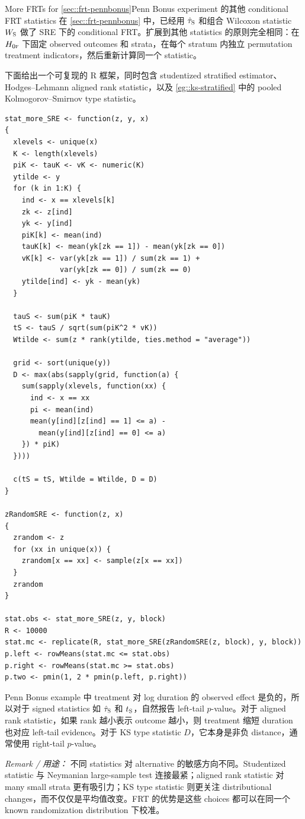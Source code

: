 \begin{exercisesolution}{More FRTs for \cref{sec::frt-pennbonus}}{Penn Bonus experiment 的其他 conditional FRT statistics}
在 \cref{sec::frt-pennbonus} 中，已经用 $\hat\tau_{\textsc{S}}$ 和组合 Wilcoxon statistic $W_{\textsc{S}}$ 做了 SRE 下的 conditional FRT。扩展到其他 statistics 的原则完全相同：在 $H_{0\textsc{f}}$ 下固定 observed outcomes 和 strata，在每个 stratum 内独立 permutation treatment indicators，然后重新计算同一个 statistic。

下面给出一个可复现的 R 框架，同时包含 studentized stratified estimator、Hodges--Lehmann aligned rank statistic，以及 \cref{eg::ks-stratified} 中的 pooled Kolmogorov--Smirnov type statistic。
\begin{lstlisting}
stat_more_SRE <- function(z, y, x)
{
  xlevels <- unique(x)
  K <- length(xlevels)
  piK <- tauK <- vK <- numeric(K)
  ytilde <- y
  for (k in 1:K) {
    ind <- x == xlevels[k]
    zk <- z[ind]
    yk <- y[ind]
    piK[k] <- mean(ind)
    tauK[k] <- mean(yk[zk == 1]) - mean(yk[zk == 0])
    vK[k] <- var(yk[zk == 1]) / sum(zk == 1) +
             var(yk[zk == 0]) / sum(zk == 0)
    ytilde[ind] <- yk - mean(yk)
  }

  tauS <- sum(piK * tauK)
  tS <- tauS / sqrt(sum(piK^2 * vK))
  Wtilde <- sum(z * rank(ytilde, ties.method = "average"))

  grid <- sort(unique(y))
  D <- max(abs(sapply(grid, function(a) {
    sum(sapply(xlevels, function(xx) {
      ind <- x == xx
      pi <- mean(ind)
      mean(y[ind][z[ind] == 1] <= a) -
        mean(y[ind][z[ind] == 0] <= a)
    }) * piK)
  })))

  c(tS = tS, Wtilde = Wtilde, D = D)
}

zRandomSRE <- function(z, x)
{
  zrandom <- z
  for (xx in unique(x)) {
    zrandom[x == xx] <- sample(z[x == xx])
  }
  zrandom
}

stat.obs <- stat_more_SRE(z, y, block)
R <- 10000
stat.mc <- replicate(R, stat_more_SRE(zRandomSRE(z, block), y, block))
p.left <- rowMeans(stat.mc <= stat.obs)
p.right <- rowMeans(stat.mc >= stat.obs)
p.two <- pmin(1, 2 * pmin(p.left, p.right))
\end{lstlisting}

Penn Bonus example 中 treatment 对 log duration 的 observed effect 是负的，所以对于 signed statistics 如 $\hat\tau_{\textsc{S}}$ 和 $t_{\textsc{S}}$，自然报告 left-tail $p$-value。对于 aligned rank statistic，如果 rank 越小表示 outcome 越小，则 treatment 缩短 duration 也对应 left-tail evidence。对于 KS type statistic $D$，它本身是非负 distance，通常使用 right-tail $p$-value。

\emph{Remark / 用途：} 不同 statistics 对 alternative 的敏感方向不同。Studentized statistic 与 Neymanian large-sample test 连接最紧；aligned rank statistic 对 many small strata 更有吸引力；KS type statistic 则更关注 distributional changes，而不仅仅是平均值改变。FRT 的优势是这些 choices 都可以在同一个 known randomization distribution 下校准。
\end{exercisesolution}

